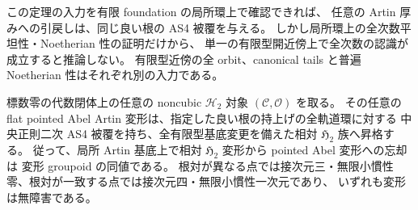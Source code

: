 \begin{remark}
この定理の入力を有限 foundation の局所環上で確認できれば、
任意の Artin 厚みへの引戻しは、同じ良い根の AS4 被覆を与える。
しかし局所環上の全次数平坦性・Noetherian 性の証明だけから、
単一の有限型開近傍上で全次数の認識が成立すると推論しない。
有限型近傍の全 orbit、canonical tails と普遍 Noetherian 性はそれぞれ別の入力である。
\end{remark}

\begin{corollary}
\label{cor:noncubic-all-artin-h2}
標数零の代数閉体上の任意の noncubic \(\mathcal H_2\) 対象
\((\mathcal C,\mathcal O)\) を取る。
その任意の flat pointed Abel Artin 変形は、指定した良い根の持上げの全軌道環に対する
中央正則二次 AS4 被覆を持ち、全有限型基底変更を備えた相対 \(\mathfrak H_2\) 族へ昇格する。
従って、局所 Artin 基底上で相対 \(\mathfrak H_2\) 変形から pointed Abel 変形への忘却は
変形 groupoid の同値である。
根対が異なる点では接次元三・無限小慣性零、根対が一致する点では接次元四・無限小慣性一次元であり、
いずれも変形は無障害である。
\end{corollary}
